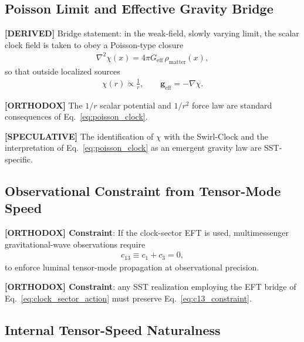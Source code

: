 \documentclass[11pt]{article}
\theoremstyle{definition}
\theoremstyle{plain}
\theoremstyle{remark}
\begin{document}
    \subsection{Poisson Limit and Effective Gravity Bridge}

        \textbf{[DERIVED]} Bridge statement: in the weak-field, slowly varying limit, the scalar clock field is taken to obey
        a Poisson-type closure
        \begin{align}
            \nabla^2 \chi(x)
            =
            4\pi G_{\mathrm{eff}} \,\rho_{\mathrm{matter}}(x),
            \label{eq:poisson_clock}
        \end{align}
        so that outside localized sources
        \begin{align}
            \chi(r) \propto \frac{1}{r},
            \qquad
            \mathbf{g}_{\mathrm{eff}} = - \nabla \chi.
            \label{eq:effective_gravity_clock}
        \end{align}

        \textbf{[ORTHODOX]} The \(1/r\) scalar potential and \(1/r^2\) force law are standard consequences of
        Eq.~\eqref{eq:poisson_clock}.

        \textbf{[SPECULATIVE]} The identification of \(\chi\) with the Swirl-Clock and the interpretation of
        Eq.~\eqref{eq:poisson_clock} as an emergent gravity law are SST-specific.

    \subsection{Observational Constraint from Tensor-Mode Speed}

        \textbf{[ORTHODOX] Constraint}: If the clock-sector EFT is used, multimessenger gravitational-wave
        observations require \cite{Monitor2017}
        \begin{align}
            c_{13} \equiv c_1 + c_3 = 0,
            \label{eq:c13_constraint}
        \end{align}
        to enforce luminal tensor-mode propagation at observational precision.

        \textbf{[ORTHODOX] Constraint}: any SST realization employing the EFT bridge of Eq.~\eqref{eq:clock_sector_action}
        must preserve Eq.~\eqref{eq:c13_constraint}.

    \subsection{Internal Tensor-Speed Naturalness}
    \label{subsec:tensor_speed_naturalness}
\end{document}
